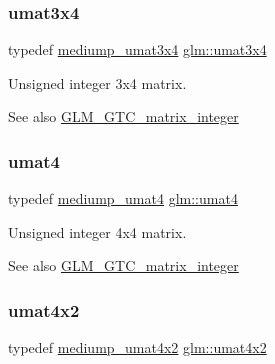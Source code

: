 \subsubsection{\texorpdfstring{umat3x4}{umat3x4}}
{\footnotesize\ttfamily typedef \hyperlink{group__gtc__matrix__integer_ga21a2361cc10822ad1a2297ac286c8e26}{mediump\+\_\+umat3x4} \hyperlink{group__gtc__matrix__integer_ga5410857d098a989a30b4017100bc2ff7}{glm\+::umat3x4}}

Unsigned integer 3x4 matrix. \begin{DoxySeeAlso}{See also}
\hyperlink{group__gtc__matrix__integer}{G\+L\+M\+\_\+\+G\+T\+C\+\_\+matrix\+\_\+integer} 
\end{DoxySeeAlso}
\mbox{\label{group__gtc__matrix__integer_ga7ae562000d8a8d193e9f93cf51e2e113}} 
\subsubsection{\texorpdfstring{umat4}{umat4}}
{\footnotesize\ttfamily typedef \hyperlink{group__gtc__matrix__integer_ga3eb3a5d85ec876ba65fad5525a5dda56}{mediump\+\_\+umat4} \hyperlink{group__gtc__matrix__integer_ga7ae562000d8a8d193e9f93cf51e2e113}{glm\+::umat4}}

Unsigned integer 4x4 matrix. \begin{DoxySeeAlso}{See also}
\hyperlink{group__gtc__matrix__integer}{G\+L\+M\+\_\+\+G\+T\+C\+\_\+matrix\+\_\+integer} 
\end{DoxySeeAlso}
\mbox{\label{group__gtc__matrix__integer_ga13e8392218e9b6e1b7f194a21b5c88bf}} 
\subsubsection{\texorpdfstring{umat4x2}{umat4x2}}
{\footnotesize\ttfamily typedef \hyperlink{group__gtc__matrix__integer_ga9dd5ce011ca43d90cf1b94084c7e90ac}{mediump\+\_\+umat4x2} \hyperlink{group__gtc__matrix__integer_ga13e8392218e9b6e1b7f194a21b5c88bf}{glm\+::umat4x2}}

